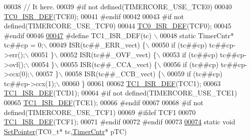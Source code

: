 \begin{DoxyCode}
00038 \textcolor{comment}{// It here. }
00039 \textcolor{preprocessor}{#if not defined(TIMERCORE\_USE\_TCE0)}
00040 \textcolor{preprocessor}{}\hyperlink{_timer_cntr_8cpp_a75b8174278ebbbe181f64d2fa6853ddf}{TC0_ISR_DEF}(TCE0);
00041 \textcolor{preprocessor}{#endif}
00042 \textcolor{preprocessor}{}
00043 \textcolor{preprocessor}{#if not defined(TIMERCORE\_USE\_TCF0)}
00044 \textcolor{preprocessor}{}\hyperlink{_timer_cntr_8cpp_a75b8174278ebbbe181f64d2fa6853ddf}{TC0_ISR_DEF}(TCF0);
00045 \textcolor{preprocessor}{#endif}
00046 \textcolor{preprocessor}{}
\hypertarget{_timer_cntr_8cpp_source_l00047}{}\hyperlink{_timer_cntr_8cpp_a914f266c151bfa683140e5abec4cc682}{00047} \textcolor{preprocessor}{#define TC1\_ISR\_DEF(tc) \(\backslash\)}
00048 \textcolor{preprocessor}{static TimerCntr*  tc##cp = 0;\(\backslash\)}
00049 \textcolor{preprocessor}{ISR(tc##\_ERR\_vect) \{\(\backslash\)}
00050 \textcolor{preprocessor}{    if (tc##cp) tc##cp->err();\(\backslash\)}
00051 \textcolor{preprocessor}{\}\(\backslash\)}
00052 \textcolor{preprocessor}{ISR(tc##\_OVF\_vect) \{\(\backslash\)}
00053 \textcolor{preprocessor}{    if (tc##cp) tc##cp->ovf();\(\backslash\)}
00054 \textcolor{preprocessor}{\}\(\backslash\)}
00055 \textcolor{preprocessor}{ISR(tc##\_CCA\_vect) \{\(\backslash\)}
00056 \textcolor{preprocessor}{    if (tc##cp) tc##cp->ccx(0);\(\backslash\)}
00057 \textcolor{preprocessor}{\}\(\backslash\)}
00058 \textcolor{preprocessor}{ISR(tc##\_CCB\_vect) \{\(\backslash\)}
00059 \textcolor{preprocessor}{    if (tc##cp) tc##cp->ccx(1);\(\backslash\)}
00060 \textcolor{preprocessor}{\}}
00061 \textcolor{preprocessor}{}
00062 \hyperlink{_timer_cntr_8cpp_a914f266c151bfa683140e5abec4cc682}{TC1_ISR_DEF}(TCC1);
00063 \hyperlink{_timer_cntr_8cpp_a914f266c151bfa683140e5abec4cc682}{TC1_ISR_DEF}(TCD1);
00064 \textcolor{preprocessor}{#if not defined(TIMERCORE\_USE\_TCE1)}
00065 \textcolor{preprocessor}{}\hyperlink{_timer_cntr_8cpp_a914f266c151bfa683140e5abec4cc682}{TC1_ISR_DEF}(TCE1);
00066 \textcolor{preprocessor}{#endif}
00067 \textcolor{preprocessor}{}
00068 \textcolor{preprocessor}{#if not defined(TIMERCORE\_USE\_TCF1)}
00069 \textcolor{preprocessor}{}\textcolor{preprocessor}{#ifdef TCF1}
00070 \textcolor{preprocessor}{}\hyperlink{_timer_cntr_8cpp_a914f266c151bfa683140e5abec4cc682}{TC1_ISR_DEF}(TCF1);
00071 \textcolor{preprocessor}{#endif}
00072 \textcolor{preprocessor}{}\textcolor{preprocessor}{#endif}
00073 \textcolor{preprocessor}{}
\hypertarget{_timer_cntr_8cpp_source_l00074}{}\hyperlink{_timer_cntr_8cpp_afb2d9165fd31c92b47af4ebc5adfc08a}{00074} \textcolor{keyword}{static} \textcolor{keywordtype}{void} \hyperlink{_hardware_serial_8cpp_aaec4e4f887a958cc22dd447565d7080b}{SetPointer}(TC0\_t* tc,\hyperlink{class_timer_cntr}{TimerCntr}* pTC)

\end{DoxyCode}
